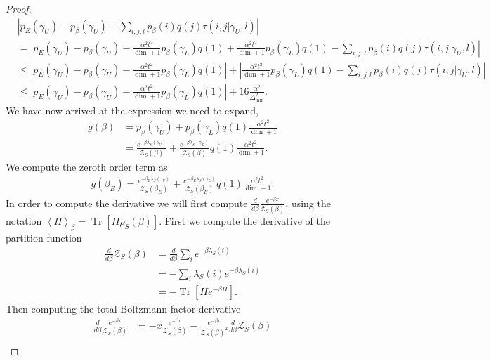 \documentclass{article}
\newcommand{\brackets}[1]{\left[ #1 \right]}
\newcommand{\abs}[1]{\left| #1 \right|}
\newcommand{\anglebrackets}[1]{\left< #1 \right>}
\DeclareMathOperator{\Tr}{Tr}
\newcommand{\trace}[1]{\Tr \brackets{ #1 }}
\newcommand{\partfun}{\mathcal{Z}}
\begin{document}
\begin{proof}
    \begin{align}
        &\abs{p_E(\gamma_U) - p_{\beta}(\gamma_U) - \sum_{i,j,l} p_{\beta}(i) q(j) \tau(i,j| \gamma_U, l) } \nonumber \\
        &= \abs{p_E(\gamma_U) - p_{\beta}(\gamma_U) - \frac{\alpha^2 t^2}{\dim + 1} p_{\beta}(\gamma_L) q(1) + \frac{\alpha^2 t^2}{\dim + 1} p_{\beta}(\gamma_L) q(1) - \sum_{i,j,l} p_{\beta}(i) q(j) \tau(i,j| \gamma_U, l) } \\
        &\leq \abs{p_E(\gamma_U) - p_{\beta}(\gamma_U) - \frac{\alpha^2 t^2}{\dim + 1} p_{\beta}(\gamma_L) q(1)} + \abs{\frac{\alpha^2 t^2}{\dim + 1} p_{\beta}(\gamma_L) q(1) - \sum_{i,j,l} p_{\beta}(i) q(j) \tau(i,j| \gamma_U, l) } \\
        &\leq \abs{p_E(\gamma_U) - p_{\beta}(\gamma_U) - \frac{\alpha^2 t^2}{\dim + 1} p_{\beta}(\gamma_L) q(1)} + 16 \frac{\alpha^2}{\Delta_{\min}^2}.
    \end{align}
    We have now arrived at the expression we need to expand, 
    \begin{align}
        g(\beta) &= p_{\beta}(\gamma_U) + p_{\beta}(\gamma_L) q(1) \frac{\alpha^2 t^2}{\dim + 1} \\
        &= \frac{e^{-\beta \lambda_S(\gamma_U)}}{\partfun_S(\beta)} + \frac{e^{-\beta \lambda_S(\gamma_L)}}{\partfun_S(\beta)} q(1) \frac{\alpha^2 t^2}{\dim  +1}.
    \end{align}
     We compute the zeroth order term as
    \begin{align}
        g(\beta_E) = \frac{e^{-\beta_E \lambda_S(\gamma_U)}}{\partfun_S(\beta_E)} + \frac{e^{-\beta_E \lambda_S(\gamma_L)}}{\partfun_S(\beta_E)} q(1) \frac{\alpha^2 t^2}{\dim  +1}.
    \end{align}
    In order to compute the derivative we will first compute $\frac{d}{d\beta} \frac{e^{-\beta x}}{\partfun_S(\beta)}$, using the notation $\anglebrackets{H}_{\beta} = \trace{H \rho_S(\beta)}$. First we compute the derivative of the partition function
    \begin{align}
        \frac{d}{d\beta} \partfun_S(\beta) &= \frac{d}{d\beta} \sum_i e^{-\beta \lambda_S(i)} \\
        &= - \sum_i \lambda_S(i) e^{-\beta \lambda_S(i)} \\
        &= - \trace{H e^{-\beta H}}.
    \end{align}
    Then computing the total Boltzmann factor derivative
    \begin{align}
        \frac{d}{d \beta} \frac{e^{-\beta x}}{\partfun_S(\beta)} &= - x \frac{e^{-\beta x}}{\partfun_S(\beta)} - \frac{e^{-\beta x}}{\partfun_S(\beta)^2} \frac{d}{d\beta}\partfun_S(\beta) \\

\end{align}
\end{proof}
\end{document}
